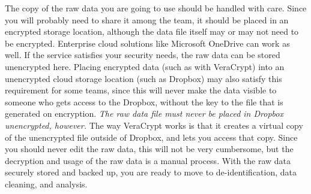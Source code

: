 The copy of the raw data you are going to use
should be handled with care.
Since you will probably need to share it among the team,
it should be placed in an encrypted storage location,
although the data file itself may or may not need to be encrypted.
Enterprise cloud solutions like Microsoft OneDrive can work as well.
If the service satisfies your security needs,
the raw data can be stored unencrypted here.
Placing encrypted data (such as with VeraCrypt)
into an unencrypted cloud storage location (such as Dropbox)
may also satisfy this requirement for some teams,
since this will never make the data visible to someone
who gets access to the Dropbox,
without the key to the file that is generated on encryption.
\textit{The raw data file must never be placed in Dropbox unencrypted, however.}
The way VeraCrypt works is that it creates a virtual copy
of the unencrypted file outside of Dropbox, and lets you access that copy.
Since you should never edit the raw data, this will not be very cumbersome,
but the decryption and usage of the raw data is a manual process.
With the raw data securely stored and backed up,
you are ready to move to de-identification, data cleaning, and analysis.



